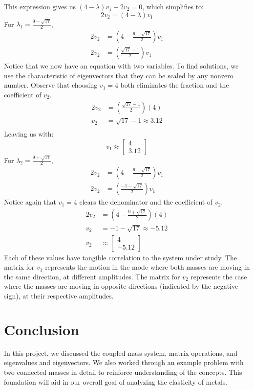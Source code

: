 \documentclass{article}
\begin{document}
This expression gives us $(4-\lambda)v_1-2v_2=0$, which simplifies to:
$$ 2v_2=(4-\lambda)v_1$$
For $\lambda_1=\frac{9-\sqrt{17}}{2}$,
\begin{align*}
    2v_2&=\left(4-\frac{9-\sqrt{17}}{2}\right)v_1 \\
    2v_2&=\left(\frac{\sqrt{17}-1}{2}\right)v_1    
\end{align*}
Notice that we now have an equation with two variables. To find solutions, we use the characteristic of eigenvectors 
that they can be scaled by any nonzero number. Observe that choosing $v_1=4$ both eliminates the fraction and the 
coefficient of $v_2$.
\begin{align*}
    2v_2&=\left(\frac{\sqrt{17}-1}{2}\right)(4) \\
    v_2&=\sqrt{17}-1\approx 3.12 \\
\end{align*}
Leaving us with:
\[
v_1\approx\begin{bmatrix}
    4 \\
    3.12
\end{bmatrix}
\]
For $\lambda_2=\frac{9+\sqrt{17}}{2}$,
\begin{align*}
    2v_2&=\left(4-\frac{9+\sqrt{17}}{2}\right)v_1 \\
    2v_2&=\left(\frac{-1-\sqrt{17}}{2}\right)v_1
\end{align*}
Notice again that $v_1=4$ clears the denominator and the coefficient of $v_2$.
\begin{align*}
    2v_2&=\left(4-\frac{9+\sqrt{17}}{2}\right)(4) \\
    v_2&=-1-\sqrt{17}\approx -5.12 \\
    v_2&\approx\begin{bmatrix}
        4 \\
        -5.12
    \end{bmatrix}
\end{align*}
Each of these values have tangible correlation to the system under study. The matrix for $v_1$ represents the motion in 
the mode where both masses are moving in the same direction, at different amplitudes. The matrix for $v_2$ represents 
the case where the masses are moving in opposite directions (indicated by the negative sign), at their respective amplitudes. 

\section{Conclusion}
In this project, we discussed the coupled-mass system, matrix operations, and eigenvalues and eigenvectors. We also worked 
through an example problem with two connected masses in detail to reinforce understanding of the concepts. This foundation 
will aid in our overall goal of analyzing the elasticity of metals.
\end{document}
